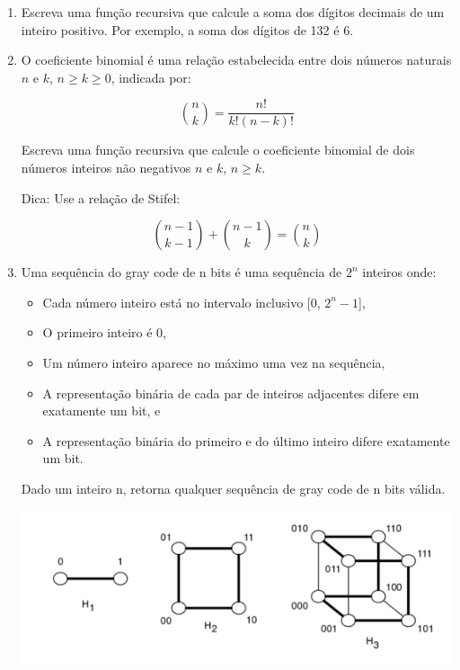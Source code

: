 \begin{enumerate}
    \item Escreva uma função recursiva que calcule a soma dos dígitos decimais de um inteiro positivo.
Por exemplo, a soma dos dígitos de 132 é 6.

    \item O coeficiente binomial é uma relação estabelecida entre dois números naturais $n$ e $k$, $n\geq k\geq 0$, indicada por:

\begin{equation}
\binom{n}{k} = \frac{n!}{k!(n-k)!}  
\end{equation}   


Escreva uma função recursiva que calcule o coeficiente binomial de dois números inteiros não negativos $n$ e $k$, $n\geq k$.
 
Dica: Use a relação de Stifel:

\begin{equation}
\binom{n-1}{k-1} + \binom{n-1}{k} = \binom{n}{k}
\end{equation}



\item Uma sequência do gray code de n bits é uma sequência de $2^n$ inteiros onde:

\begin{itemize}
\item Cada número inteiro está no intervalo inclusivo [0, $2^n - 1$],
\item O primeiro inteiro é 0,
\item Um número inteiro aparece no máximo uma vez na sequência,
\item A representação binária de cada par de inteiros adjacentes difere em exatamente um bit, e
\item A representação binária do primeiro e do último inteiro difere exatamente um bit.
\end{itemize}

Dado um inteiro n, retorna qualquer sequência de gray code de n bits válida.

\begin{center}
\includegraphics[scale=0.8]{images/hipercubo.png} 
\end{center}


\end{enumerate}
